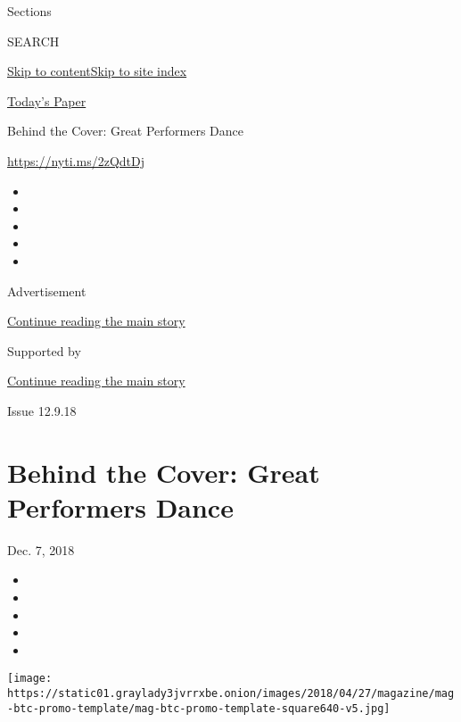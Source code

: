 Sections

SEARCH

\protect\hyperlink{site-content}{Skip to
content}\protect\hyperlink{site-index}{Skip to site index}

\href{https://myaccount.nytimes3xbfgragh.onion/auth/login?response_type=cookie\&client_id=vi}{}

\href{https://www.nytimes3xbfgragh.onion/section/todayspaper}{Today's
Paper}

Behind the Cover: Great Performers Dance

\url{https://nyti.ms/2zQdtDj}

\begin{itemize}
\item
\item
\item
\item
\item
\end{itemize}

Advertisement

\protect\hyperlink{after-top}{Continue reading the main story}

Supported by

\protect\hyperlink{after-sponsor}{Continue reading the main story}

Issue 12.9.18

\hypertarget{behind-the-cover-great-performers-dance}{%
\section{Behind the Cover: Great Performers
Dance}\label{behind-the-cover-great-performers-dance}}

Dec. 7, 2018

\begin{itemize}
\item
\item
\item
\item
\item
\end{itemize}

\texttt{[image: https://static01.graylady3jvrrxbe.onion/images/2018/04/27/magazine/mag-btc-promo-template/mag-btc-promo-template-square640-v5.jpg]}

